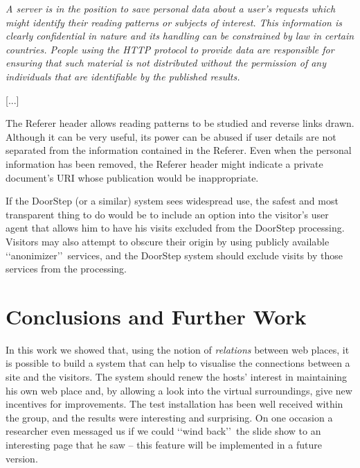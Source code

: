 \documentclass[a4paper]{danarticle}
\theoremstyle{remark}
\begin{document}
    \begin{center}
       \begin{minipage}{10cm}
       \itshape
          A server is in the position to save personal data about a user's
          requests which might identify their reading patterns or subjects of
          interest. This information is clearly confidential in nature and its
          handling can be constrained by law in certain countries. People using
          the HTTP protocol to provide data are responsible for ensuring that
          such material is not distributed without the permission of any
          individuals that are identifiable by the published results.
   
          [...]
   
          The Referer header allows reading patterns to be studied and reverse
          links drawn. Although it can be very useful, its power can be abused
          if user details are not separated from the information contained in
          the Referer. Even when the personal information has been removed, the
          Referer header might indicate a private document's URI whose
          publication would be inappropriate.
       \end{minipage}
    \end{center}
    
    If the DoorStep (or a similar) system sees widespread use, the safest and 
    most transparent thing to do would be to include an option into the
    visitor's user agent that allows him to have his visits excluded from the
    DoorStep processing. Visitors may also attempt to obscure their origin by
    using publicly available \lq\lq anonimizer\rq\rq\ services, and the DoorStep
    system should exclude visits by those services from the processing.
  \section{Conclusions and Further Work} In this work we showed that, using 
    the notion of \textit{relations} between web places, it is possible to build 
    a system that can help to visualise the connections between a site and the 
    visitors. The system should renew the hosts' interest in maintaining his own 
    web place and, by allowing a look into the virtual surroundings, give new 
    incentives for improvements. The test installation has been well received 
    within the group, and the results were interesting and surprising. On one 
    occasion a researcher even messaged us if we could \lq\lq wind back\rq\rq\ 
    the slide show to an interesting page that he saw -- this feature will be 
    implemented in a future version.
    
\end{document}
